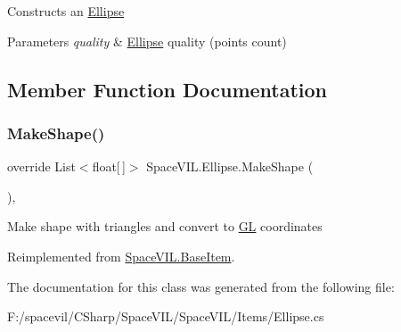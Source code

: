 Constructs an \mbox{\hyperlink{class_space_v_i_l_1_1_ellipse}{Ellipse}} 


\begin{DoxyParams}{Parameters}
{\em quality} & \mbox{\hyperlink{class_space_v_i_l_1_1_ellipse}{Ellipse}} quality (points count) \\
\hline
\end{DoxyParams}


\subsection{Member Function Documentation}
\mbox{\label{class_space_v_i_l_1_1_ellipse_aa2311fd87e9a988eca0d754ad6e9093d}} 
\subsubsection{\texorpdfstring{Make\+Shape()}{MakeShape()}}
{\footnotesize\ttfamily override List$<$float\mbox{[}$\,$\mbox{]}$>$ Space\+V\+I\+L.\+Ellipse.\+Make\+Shape (\begin{DoxyParamCaption}{ }\end{DoxyParamCaption})\hspace{0.3cm}{\ttfamily [inline]}, {\ttfamily [virtual]}}



Make shape with triangles and convert to \mbox{\hyperlink{namespace_g_l}{GL}} coordinates 



Reimplemented from \mbox{\hyperlink{class_space_v_i_l_1_1_base_item_ac111d3d8cef36f406aa11862cefab9e2}{Space\+V\+I\+L.\+Base\+Item}}.



The documentation for this class was generated from the following file\+:\begin{DoxyCompactItemize}
\item 
F\+:/spacevil/\+C\+Sharp/\+Space\+V\+I\+L/\+Space\+V\+I\+L/\+Items/Ellipse.\+cs\end{DoxyCompactItemize}
